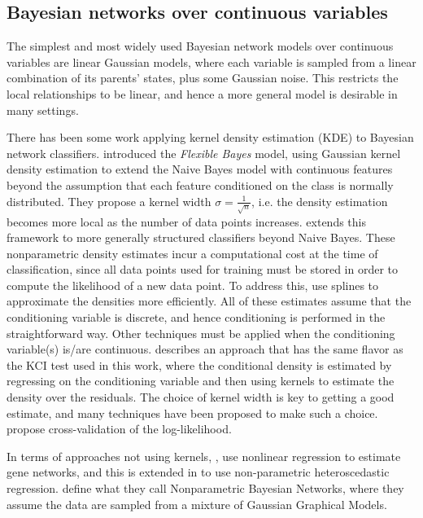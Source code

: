 \documentclass{article} %
\begin{document}
\subsection{Bayesian networks over continuous variables}
The simplest and most widely used Bayesian network models over continuous variables are linear Gaussian models, where each variable is sampled from a linear combination of its parents' states, plus some Gaussian noise.  This restricts the local relationships to be linear, and hence a more general model is desirable in many settings.

There has been some work applying kernel density estimation (KDE) to Bayesian network classifiers. \cite{john1995estimating} introduced the {\it Flexible Bayes} model, using Gaussian kernel density estimation to extend the Naive Bayes model with continuous features beyond the assumption that each feature conditioned on the class is normally distributed.  They propose a kernel width $\sigma = \frac{1}{\sqrt n}$, i.e. the density estimation becomes more local as the number of data points increases.  \cite{perez2009bayesian} extends this framework to more generally structured classifiers beyond Naive Bayes. These nonparametric density estimates incur a computational cost at the time of classification, since all data points used for training must be stored in order to compute the likelihood of a new data point.  To address this, \cite{gurwicz2004rapid} use splines to approximate the densities more efficiently.  All of these estimates assume that the conditioning variable is discrete, and hence conditioning is performed in the straightforward way.  Other techniques must be applied when the conditioning variable(s) is/are continuous.  \cite{hansen2004nonparametric} describes an approach that has the same flavor as the KCI test used in this work, where the conditional density is estimated by regressing on the conditioning variable and then using kernels to estimate the density over the residuals.  The choice of kernel width is key to getting a good estimate, and many techniques have been proposed to make such a choice.  \cite{holmes2012fast} propose cross-validation of the log-likelihood.  

In terms of approaches not using kernels, \cite{imoto2001estimation}, use nonlinear regression to estimate gene networks, and this is extended in \cite{imoto2003bayesian} to use non-parametric heteroscedastic regression.  \cite{ickstadt2010nonparametric} define what they call Nonparametric Bayesian Networks, where they assume the data are sampled from a mixture of Gaussian Graphical Models.
\end{document}
